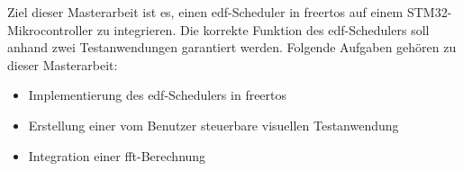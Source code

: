 \documentclass[../EDF Master Thesis.tex]{subfiles}
\begin{document}
    Ziel dieser Masterarbeit ist es, einen \ac{edf}-Scheduler in \ac{freertos} auf einem STM32-Mikrocontroller zu integrieren.
    Die korrekte Funktion des \ac{edf}-Schedulers soll anhand zwei Testanwendungen garantiert werden.
    Folgende Aufgaben gehören zu dieser Masterarbeit:
    \begin{itemize}
        \item Implementierung des \ac{edf}-Schedulers in \ac{freertos}
        \item Erstellung einer vom Benutzer steuerbare visuellen Testanwendung
        \item Integration einer \ac{fft}-Berechnung
    \end{itemize}
\end{document}
